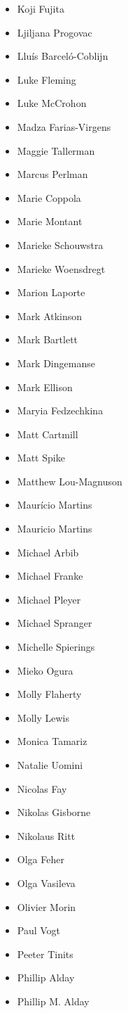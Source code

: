 \begin{multicols}{3}
\begin{itemize}[label={},leftmargin=*]
\item Koji Fujita
\item Ljiljana Progovac
\item Llu\'{i}s Barcel\'o-Coblijn
\item Luke Fleming
\item Luke McCrohon
\item Madza Farias-Virgens
\item Maggie Tallerman
\item Marcus Perlman
\item Marie Coppola
\item Marie Montant
\item Marieke Schouwstra
\item Marieke Woensdregt
\item Marion Laporte
\item Mark Atkinson
\item Mark Bartlett
\item Mark Dingemanse
\item Mark Ellison
\item Maryia Fedzechkina
\item Matt Cartmill
\item Matt Spike
\item Matthew Lou-Magnuson
\item Maur\'{i}cio Martins
\item Mauricio Martins
\item Michael Arbib
\item Michael Franke
\item Michael Pleyer
\item Michael Spranger
\item Michelle Spierings
\item Mieko Ogura
\item Molly Flaherty
\item Molly Lewis
\item Monica Tamariz
\item Natalie Uomini
\item Nicolas Fay
\item Nikolas Gisborne
\item Nikolaus Ritt
\item Olga Feher
\item Olga Vasileva
\item Olivier Morin
\item Paul Vogt
\item Peeter Tinits
\item Phillip Alday
\item Phillip M. Alday

\end{itemize}
\end{multicols}
